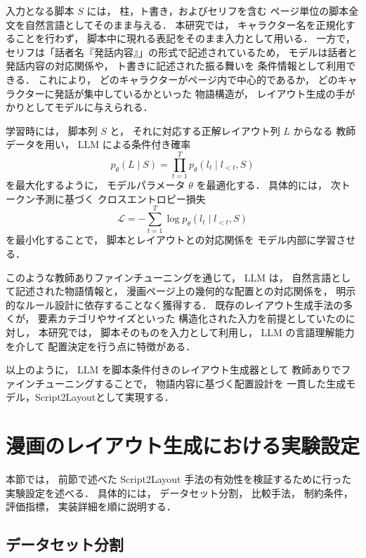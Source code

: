 \documentclass[a4j,12pt,dvipdfmx]{jsreport}
\begin{document}
入力となる脚本 $S$ には，
柱，ト書き，およびセリフを含む
ページ単位の脚本全文を自然言語としてそのまま与える．
本研究では，
キャラクター名を正規化することを行わず，
脚本中に現れる表記をそのまま入力として用いる．
一方で，
セリフは「話者名『発話内容』」の形式で記述されているため，
モデルは話者と発話内容の対応関係や，
ト書きに記述された振る舞いを
条件情報として利用できる．
これにより，
どのキャラクターがページ内で中心的であるか，
どのキャラクターに発話が集中しているかといった
物語構造が，
レイアウト生成の手がかりとしてモデルに与えられる．

学習時には，
脚本列 $S$ と，
それに対応する正解レイアウト列 $L$ からなる
教師データを用い，
LLM による条件付き確率
\begin{equation}
  p_{\theta}(L \mid S)
  =
  \prod_{t=1}^{T}
  p_{\theta}(l_t \mid l_{<t}, S)
\end{equation}
を最大化するように，
モデルパラメータ $\theta$ を最適化する．
具体的には，
次トークン予測に基づく
クロスエントロピー損失
\begin{equation}
  \mathcal{L}
  =
  - \sum_{t=1}^{T}
  \log p_{\theta}(l_t \mid l_{<t}, S)
\end{equation}
を最小化することで，
脚本とレイアウトとの対応関係を
モデル内部に学習させる．

このような教師ありファインチューニングを通じて，
LLM は，
自然言語として記述された物語情報と，
漫画ページ上の幾何的な配置との対応関係を，
明示的なルール設計に依存することなく獲得する．
既存のレイアウト生成手法の多くが，
要素カテゴリやサイズといった
構造化された入力を前提としていたのに対し，
本研究では，
脚本そのものを入力として利用し，
LLM の言語理解能力を介して
配置決定を行う点に特徴がある．

以上のように，
LLM を脚本条件付きのレイアウト生成器として
教師ありでファインチューニングすることで，
物語内容に基づく配置設計を
一貫した生成モデル，Script2Layoutとして実現する．

\section{漫画のレイアウト生成における実験設定}\label{sec:experimental_setup}

本節では，
前節で述べた Script2Layout 手法の有効性を検証するために行った
実験設定を述べる．
具体的には，
データセット分割，
比較手法，
制約条件，
評価指標，
実装詳細を順に説明する．

\subsection{データセット分割}
\end{document}
